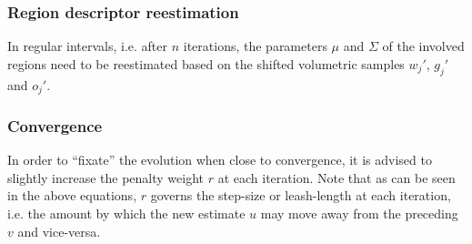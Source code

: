 \subsubsection{Region descriptor reestimation}
In regular intervals, i.e. after $n$ iterations, the parameters $\mu$ and $\Sigma$ of the involved regions need to be reestimated based on the shifted volumetric samples $w_j'$, $g_j'$ and $o_j'$.

\subsubsection{Convergence}
In order to ``fixate'' the evolution when close to convergence, it is advised to slightly increase the penalty weight $r$ at each iteration. Note that as can be seen in the above equations, $r$ governs the step-size or  leash-length at each iteration, i.e. the amount by which the new estimate $u$ may move away from the preceding $v$ and vice-versa. 
